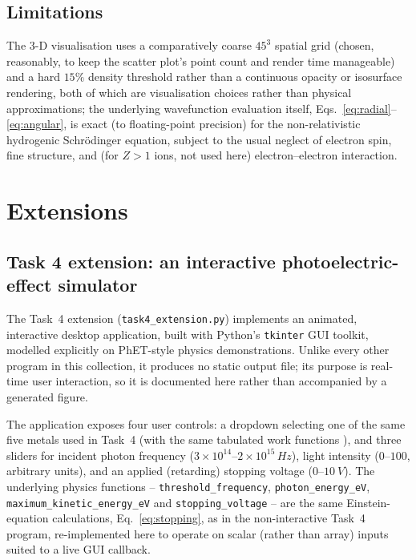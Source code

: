 \documentclass[11pt]{article}
\begin{document}
\subsection{Limitations}
The 3-D visualisation uses a comparatively coarse $45^3$ spatial grid (chosen, reasonably, to keep the scatter plot's point count and render time manageable) and a hard $15\%$ density threshold rather than a continuous opacity or isosurface rendering, both of which are visualisation choices rather than physical approximations; the underlying wavefunction evaluation itself, Eqs.~\eqref{eq:radial}--\eqref{eq:angular}, is exact (to floating-point precision) for the non-relativistic hydrogenic Schr\"odinger equation, subject to the usual neglect of electron spin, fine structure, and (for $Z>1$ ions, not used here) electron--electron interaction.

\section{Extensions}
\label{sec:extensions}

\subsection{Task 4 extension: an interactive photoelectric-effect simulator}
\label{sec:ext4}
The Task~4 extension (\texttt{task4\_extension.py}) implements an animated, interactive desktop application, built with Python's \texttt{tkinter} GUI toolkit, modelled explicitly on PhET-style physics demonstrations. Unlike every other program in this collection, it produces no static output file; its purpose is real-time user interaction, so it is documented here rather than accompanied by a generated figure.

The application exposes four user controls: a dropdown selecting one of the same five metals used in Task~4 (with the same tabulated work functions \cite{hyperphysics}), and three sliders for incident photon frequency ($3\times10^{14}$--$2\times10^{15}\,\si{Hz}$), light intensity ($0$--$100$, arbitrary units), and an applied (retarding) stopping voltage ($0$--$\SI{10}{V}$). The underlying physics functions -- \texttt{threshold\_frequency}, \texttt{photon\_energy\_eV}, \texttt{maximum\_kinetic\_energy\_eV} and \texttt{stopping\_voltage} -- are the same Einstein-equation calculations, Eq.~\eqref{eq:stopping}, as in the non-interactive Task~4 program, re-implemented here to operate on scalar (rather than array) inputs suited to a live GUI callback.
\end{document}
